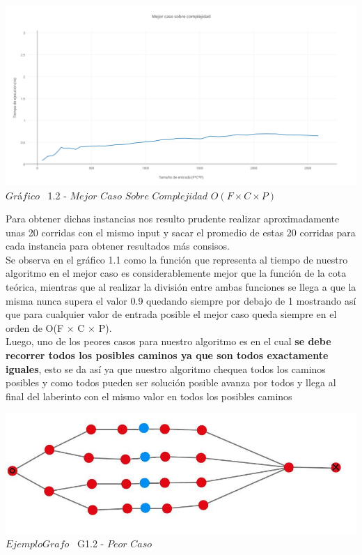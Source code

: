\vspace*{0.3cm} \vspace*{0.3cm}
  \begin{center}
 \includegraphics[scale=0.65]{./EJ1/mejorcaso1.png}
 {$Gr$\'a$fico$ \ 1.2 - $Mejor$ $Caso$ $Sobre$ $Complejidad$ $O(F \times C \times P)$}
  \end{center}
  \vspace*{0.3cm}

 Para obtener dichas instancias nos resulto prudente realizar aproximadamente unas 20 corridas con el mismo input y sacar el promedio de estas 20 corridas para cada instancia para obtener resultados m\'as consisos.\\ 

Se observa en el gr\'afico 1.1 como la funci\'on que representa al tiempo de nuestro algoritmo en el mejor caso es considerablemente mejor que la funci\'on de la cota te\'orica, mientras que al realizar la divisi\'on entre ambas funciones se llega a que la misma nunca supera el valor 0.9 quedando siempre por debajo de 1 mostrando as\'i que para cualquier valor de entrada posible el mejor caso queda siempre en el orden de  O(F $\times$ C $\times$ P).\\

Luego, uno de los peores casos para nuestro algoritmo es en el cual  \textbf{se debe recorrer todos los posibles caminos ya que son todos exactamente iguales}, esto se da as\'i ya que nuestro algoritmo chequea todos los caminos posibles y como todos pueden ser soluci\'on posible avanza por todos y llega al final del laberinto con el mismo valor en todos los posibles caminos\\

\vspace*{0.3cm} \vspace*{0.3cm}
  \begin{center}
\includegraphics[scale=0.65]{./EJ1/ej1grafopeorcaso.jpeg}
{$Ejemplo Grafo$ \ G1.2 - $Peor$ $Caso$}
  \end{center}
  \vspace*{0.3cm}

